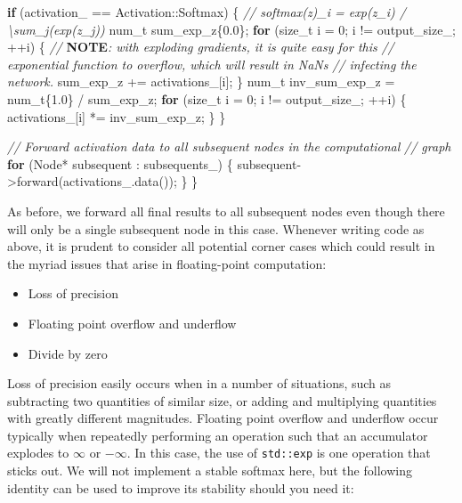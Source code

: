 \documentclass[
]{article}
\newenvironment{Shaded}{}{}
\newcommand{\AlertTok}[1]{\textcolor[rgb]{1.00,0.00,0.00}{\textbf{#1}}}
\newcommand{\CommentTok}[1]{\textcolor[rgb]{0.38,0.63,0.69}{\textit{#1}}}
\newcommand{\ControlFlowTok}[1]{\textcolor[rgb]{0.00,0.44,0.13}{\textbf{#1}}}
\newcommand{\DataTypeTok}[1]{\textcolor[rgb]{0.56,0.13,0.00}{#1}}
\newcommand{\DecValTok}[1]{\textcolor[rgb]{0.25,0.63,0.44}{#1}}
\newcommand{\FloatTok}[1]{\textcolor[rgb]{0.25,0.63,0.44}{#1}}
\newcommand{\NormalTok}[1]{#1}
\newcommand{\VariableTok}[1]{\textcolor[rgb]{0.10,0.09,0.49}{#1}}
\providecommand{\tightlist}{%
  \setlength{\itemsep}{0pt}\setlength{\parskip}{0pt}}
\begin{document}
\begin{Shaded}
\begin{Highlighting}[]
    \ControlFlowTok{if}\NormalTok{ (}\VariableTok{activation\_}\NormalTok{ == Activation::Softmax)}
\NormalTok{    \{}
        \CommentTok{// softmax(z)\_i = exp(z\_i) / \textbackslash{}sum\_j(exp(z\_j))}
        \DataTypeTok{num\_t}\NormalTok{ sum\_exp\_z\{}\FloatTok{0.0}\NormalTok{\};}
        \ControlFlowTok{for}\NormalTok{ (}\DataTypeTok{size\_t}\NormalTok{ i = }\DecValTok{0}\NormalTok{; i != }\VariableTok{output\_size\_}\NormalTok{; ++i)}
\NormalTok{        \{}
            \CommentTok{// }\AlertTok{NOTE}\CommentTok{: with exploding gradients, it is quite easy for this}
            \CommentTok{// exponential function to overflow, which will result in NaNs}
            \CommentTok{// infecting the network.}
\NormalTok{            sum\_exp\_z += }\VariableTok{activations\_}\NormalTok{[i];}
\NormalTok{        \}}
        \DataTypeTok{num\_t}\NormalTok{ inv\_sum\_exp\_z = }\DataTypeTok{num\_t}\NormalTok{\{}\FloatTok{1.0}\NormalTok{\} / sum\_exp\_z;}
        \ControlFlowTok{for}\NormalTok{ (}\DataTypeTok{size\_t}\NormalTok{ i = }\DecValTok{0}\NormalTok{; i != }\VariableTok{output\_size\_}\NormalTok{; ++i)}
\NormalTok{        \{}
            \VariableTok{activations\_}\NormalTok{[i] *= inv\_sum\_exp\_z;}
\NormalTok{        \}}
\NormalTok{    \}}

    \CommentTok{// Forward activation data to all subsequent nodes in the computational}
    \CommentTok{// graph}
    \ControlFlowTok{for}\NormalTok{ (Node* subsequent : }\VariableTok{subsequents\_}\NormalTok{)}
\NormalTok{    \{}
\NormalTok{        subsequent{-}\textgreater{}forward(}\VariableTok{activations\_}\NormalTok{.data());}
\NormalTok{    \}}
\NormalTok{\}}
\end{Highlighting}
\end{Shaded}

As before, we forward all final results to all subsequent nodes even
though there will only be a single subsequent node in this case.
Whenever writing code as above, it is prudent to consider all potential
corner cases which could result in the myriad issues that arise in
floating-point computation:

\begin{itemize}
\tightlist
\item
  Loss of precision
\item
  Floating point overflow and underflow
\item
  Divide by zero
\end{itemize}

Loss of precision easily occurs when in a number of situations, such as
subtracting two quantities of similar size, or adding and multiplying
quantities with greatly different magnitudes. Floating point overflow
and underflow occur typically when repeatedly performing an operation
such that an accumulator explodes to \(\infty\) or \(-\infty\). In this
case, the use of \texttt{std::exp} is one operation that sticks out. We
will not implement a stable softmax here, but the following identity can
be used to improve its stability should you need it:
\end{document}
